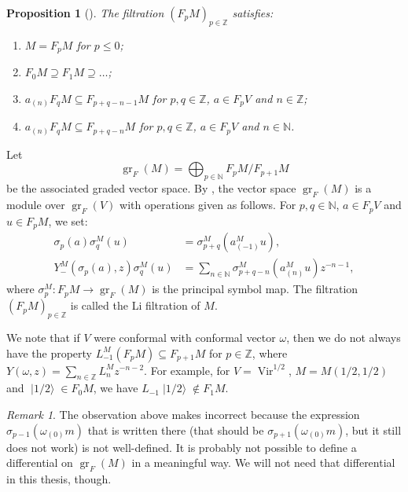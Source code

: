 \documentclass[a4paper, 12pt, reqno]{amsart}
\newtheorem{proposition}[theorem]{Proposition}
\theoremstyle{remark}
\newtheorem{remark}[theorem]{Remark}
\DeclareMathOperator{\Vir}{Vir}
\DeclareMathOperator{\gr}{gr}
\DeclareMathOperator{\vachalf}{|1/2\rangle}
\begin{document}
\begin{proposition}[{\cite{li_abelianizing_2005}}]
  \label{prp:16}
  The filtration $(F_pM)_{p \in \mathbb{Z}}$ satisfies:
  \begin{enumerate}
  \item $M = F_pM$ for $p \le 0$;
  \item $F_0M \supseteq F_1M \supseteq \dots$;
  \item $a_{(n)}F_qM \subseteq F_{p + q - n - 1}M$ for $p, q \in \mathbb{Z}$, $a \in F_pV$ and $n \in \mathbb{Z}$;
  \item $a_{(n)}F_qM \subseteq F_{p + q - n}M$ for $p, q \in \mathbb{Z}$, $a \in F_pV$ and $n \in \mathbb{N}$.
  \end{enumerate}
\end{proposition}

Let
\begin{equation*}
  \gr_F(M) = \bigoplus_{p \in \mathbb{N}}F_pM/F_{p + 1}M
\end{equation*}
be the associated graded vector space.
By \cite{li_abelianizing_2005}, the vector space $\gr_F(M)$ is a module over $\gr_F(V)$ with operations given as follows.
For $p, q \in \mathbb{N}$, $a \in F_pV$ and $u \in F_pM$, we set:
\begin{align*}
  \sigma_p(a)\sigma^M_q(u) &= \sigma^M_{p + q}(a^M_{(-1)}u), \\
  Y^M_-(\sigma_p(a), z)\sigma^M_q(u) &= \sum_{n \in \mathbb{N}}\sigma^M_{p + q - n}(a^M_{(n)}u)z^{-n - 1},
\end{align*}
where $\sigma^M_p: F_pM \to \gr_F(M)$ is the principal symbol map.
The filtration $(F_pM)_{p \in \mathbb{Z}}$ is called the Li filtration of $M$.

We note that if $V$ were conformal with conformal vector $\omega$, then we do not always have the property $L_{-1}^M(F_pM) \subseteq F_{p + 1}M$ for $p \in \mathbb{Z}$, where $Y(\omega, z) = \sum_{n \in \mathbb{Z}}L^M_nz^{-n - 2}$.
For example, for $V = \Vir^{1/2}$, $M = M(1/2, 1/2)$ and $\vachalf \in F_0M$, we have $L_{-1}\vachalf \notin F_1M$.

\begin{remark}
  \label{rmk:40}
  The observation above makes \cite[Lemma 3.1.2]{arakawa_remark_2012} incorrect because the expression $\sigma_{p - 1}(\omega_{(0)}m)$ that is written there (that should be $\sigma_{p + 1}(\omega_{(0)}m)$, but it still does not work) is not well-defined.
  It is probably not possible to define a differential on $\gr_F(M)$ in a meaningful way.
  We will not need that differential in this thesis, though.
\end{remark}
\end{document}
